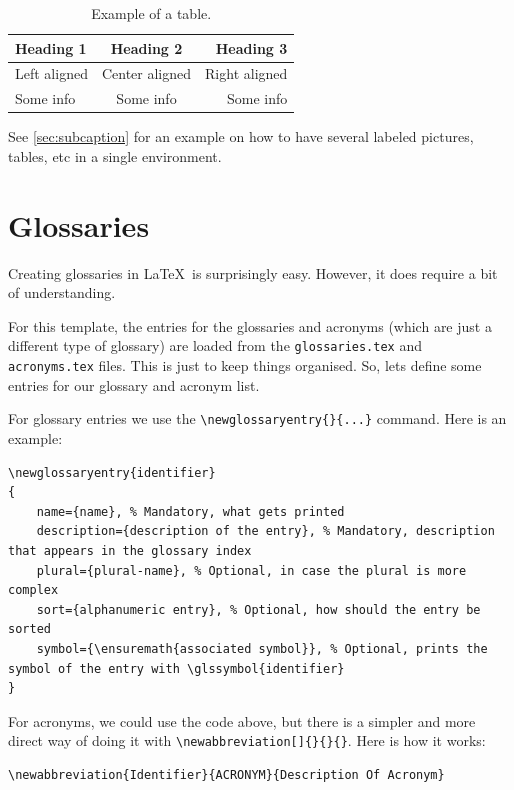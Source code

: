 \begin{table}[h]
	\centering %
	\begin{tabular}{lcr}
	  \toprule
	  Heading 1 & Heading 2 & Heading 3 \\
	  \midrule
	  Left aligned & Center aligned & Right aligned \\
	  \cmidrule{2-3} %
	  Some info & Some info & Some info \\
	  \bottomrule
	\end{tabular}
	\caption{Example of a table.}
	\label{tab:example-table}
\end{table}

See \cref{sec:subcaption} for an example on how to have several labeled pictures, tables, etc in a single environment.

\FloatBarrier

\section{Glossaries}\label{sec:glossaries}

Creating glossaries in \LaTeX\ is surprisingly easy. However, it does require a bit of understanding.

For this template, the entries for the glossaries and acronyms (which are just a different type of glossary) are loaded from the \texttt{glossaries.tex} and \texttt{acronyms.tex} files. This is just to keep things organised. So, lets define some entries for our glossary and acronym list.

For glossary entries we use the \verb|\newglossaryentry{}{...}| command. Here is an example:

\begin{lstlisting}[language={[LaTeX]TeX}]
\newglossaryentry{identifier}
{
	name={name}, % Mandatory, what gets printed
	description={description of the entry}, % Mandatory, description that appears in the glossary index
	plural={plural-name}, % Optional, in case the plural is more complex
	sort={alphanumeric entry}, % Optional, how should the entry be sorted
	symbol={\ensuremath{associated symbol}}, % Optional, prints the symbol of the entry with \glssymbol{identifier}
}
\end{lstlisting}

For acronyms, we could use the code above, but there is a simpler and more direct way of doing it with \verb|\newabbreviation[]{}{}{}|. Here is how it works:

\begin{lstlisting}[language={[LaTeX]TeX}]
\newabbreviation{Identifier}{ACRONYM}{Description Of Acronym}
\end{lstlisting}


